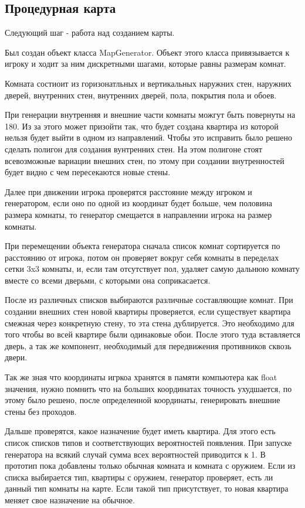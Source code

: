 \documentclass[14pt, titlepage,fleqn,a4paper]{extarticle}
\begin{document}
    \subsection*{Процедурная карта}
	
	Следующий шаг - работа над созданием карты.
	
	Был создан объект класса MapGenerator. Объект этого класса привязывается к игроку и ходит за ним дискретными шагами, которые равны размерам комнат. 
	
	Комната состиоит из горизонатльных и вертикальных наружних стен, наружних дверей, внутренних стен, внутренних дверей, пола, покрытия пола и обоев.
	
	При генерации внутренняя и внешние части комнаты можгут быть повернуты на 180\textdegree. Из за этого может призойти так, что будет создана квартира из которой нельзя будет выйти в одном из направлений. Чтобы это исправить было решено сделать полигон для создания вунтренних стен. На этом полигоне стоят всевозможные вариации внешних стен, по этому при создании внутренностей будет видно с чем пересекаются новые стены.
	
	Далее при движении игрока проверятся расстояние между игроком и генератором, если оно по одной из координат будет больше, чем половина размера комнаты, то генератор смещается в направлении игрока на размер комнаты. 
	
	При перемещении объекта генератора сначала список комнат сортируется по расстоянию от игрока, потом он проверяет вокруг себя комнаты в переделах сетки 3x3 комнаты, и, если там отсутствует пол, удаляет самую дальнюю комнату вместе со всеми дверьми, с которыми она соприкасается. 
	
	После из различных списков выбираются различные составляющие комнат. При создании внешних стен новой квартиры проверяется, если существует квартира смежная через конкретную стену, то эта стена дублируется.
	Это необходимо для того чтобы во всей квартире были одинаковые обои. После этого туда вставляется дверь, а так же компонент, необходимый для передвижения противников сквозь двери.
	
    Так же зная что координаты игркоа хранятся в памяти компьютера как float значения, нужно помнить что на больших координатах точность ухудшается, по этому было решено, после определенной координаты, генерировать внешние стены без проходов.
	
	Дальше проверятся, какое назначение будет иметь квартира. Для этого есть список списков типов и соответствующих вероятностей появления. При запуске генератора на всякий случай сумма всех вероятностей приводится к 1.
	В прототип пока добавлены только обычная комната и комната с оружием.
	Если из списка выбирается тип, квартиры с оружием, генератор проверяет, есть ли данный тип комнаты на карте. Если такой тип присутствует, то новая квартира меняет свое назначение на обычное.
	
\end{document}
